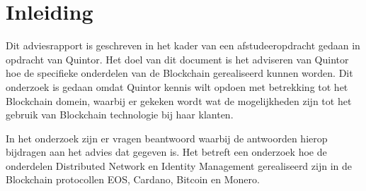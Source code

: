 \newpage
\section*{Inleiding}

Dit adviesrapport is geschreven in het kader van een afstudeeropdracht gedaan in opdracht van Quintor. Het doel van dit document is het adviseren van Quintor hoe de specifieke onderdelen van de Blockchain gerealiseerd kunnen worden. Dit onderzoek is gedaan omdat Quintor kennis wilt opdoen met betrekking tot het Blockchain domein, waarbij er gekeken wordt wat de mogelijkheden zijn tot het gebruik van Blockchain technologie bij haar klanten.

In het onderzoek zijn er vragen beantwoord waarbij de antwoorden hierop bijdragen aan het advies dat gegeven is. Het betreft een onderzoek hoe de onderdelen Distributed Network en Identity Management gerealiseerd zijn in de Blockchain protocollen EOS, Cardano, Bitcoin en Monero.
